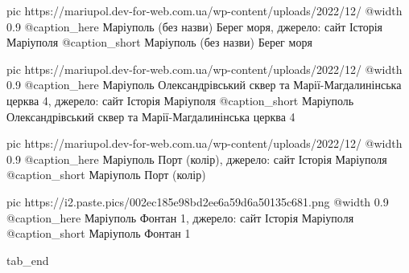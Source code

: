   pic https://mariupol.dev-for-web.com.ua/wp-content/uploads/2022/12/%
  @width 0.9
  @caption_here Маріуполь (без назви) Берег моря, джерело: сайт Історія Маріуполя
  @caption_short Маріуполь (без назви) Берег моря

  pic https://mariupol.dev-for-web.com.ua/wp-content/uploads/2022/12/%
  @width 0.9
  @caption_here Маріуполь Олександрівський сквер та Марії-Магдалинінська церква 4, джерело: сайт Історія Маріуполя
  @caption_short Маріуполь Олександрівський сквер та Марії-Магдалинінська церква 4

  pic https://mariupol.dev-for-web.com.ua/wp-content/uploads/2022/12/%
  @width 0.9
  @caption_here Маріуполь Порт (колір), джерело: сайт Історія Маріуполя
  @caption_short Маріуполь Порт (колір)

  pic https://i2.paste.pics/002ec185e98bd2ee6a59d6a50135c681.png
  @width 0.9
  @caption_here Маріуполь Фонтан 1, джерело: сайт Історія Маріуполя
  @caption_short Маріуполь Фонтан 1

  tab_end
\fi
